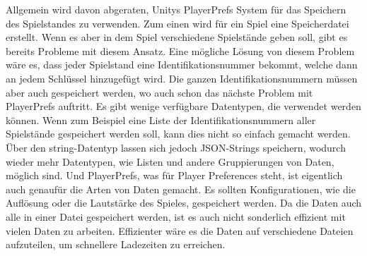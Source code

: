 Allgemein wird davon abgeraten, Unitys PlayerPrefs System für das Speichern des Spielstandes zu verwenden. Zum einen wird für ein Spiel eine Speicherdatei erstellt. Wenn es aber in dem Spiel verschiedene Spielstände geben soll, gibt es bereits Probleme mit diesem Ansatz. Eine mögliche Lösung von diesem Problem wäre es, dass jeder Spielstand eine Identifikationsnummer bekommt, welche dann an jedem Schlüssel hinzugefügt wird. Die ganzen Identifikationsnummern müssen aber auch gespeichert werden, wo auch schon das nächste Problem mit PlayerPrefs auftritt. Es gibt wenige verfügbare Datentypen, die verwendet werden können. Wenn zum Beispiel eine Liste der Identifikationsnummern aller Spielstände gespeichert werden soll, kann dies nicht so einfach gemacht werden. Über den string-Datentyp lassen sich jedoch JSON-Strings speichern, wodurch wieder mehr Datentypen, wie Listen und andere Gruppierungen von Daten, möglich sind. Und PlayerPrefs, was für Player Preferences steht, ist eigentlich auch genaufür die Arten von Daten gemacht. Es sollten Konfigurationen, wie die Auflösung oder die Lautstärke des Spieles, gespeichert werden. Da die Daten auch alle in einer Datei gespeichert werden, ist es auch nicht sonderlich effizient mit vielen Daten zu arbeiten. Effizienter wäre es die Daten auf verschiedene Dateien aufzuteilen, um schnellere Ladezeiten zu erreichen.
\cite{unityPersistentData}\cite{logrocketPlayerPrefs}\cite{gamedevbeginnerPlayerPrefs}

